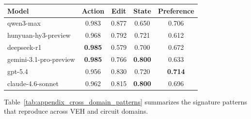 \begin{center}
\label{tab:appendix_circuit_profile}
\scriptsize
\setlength{\tabcolsep}{5pt}
\renewcommand{\arraystretch}{1.08}
\begin{tabular}{lcccc}
\toprule
Model & Action & Edit & State & Preference \\
\midrule
qwen3-max & 0.983 & 0.877 & 0.650 & 0.706 \\
hunyuan-hy3-preview & 0.968 & 0.792 & 0.721 & 0.612 \\
deepseek-r1 & \textbf{0.985} & 0.579 & 0.700 & 0.672 \\
gemini-3.1-pro-preview & \textbf{0.985} & 0.766 & \textbf{0.800} & 0.633 \\
gpt-5.4 & 0.956 & 0.830 & 0.720 & \textbf{0.714} \\
claude-4.6-sonnet & 0.962 & 0.815 & \textbf{0.800} & 0.696 \\
\bottomrule
\end{tabular}
\end{center}

Table~\ref{tab:appendix_cross_domain_patterns} summarizes the signature patterns that reproduce across VEH and circuit domains.

